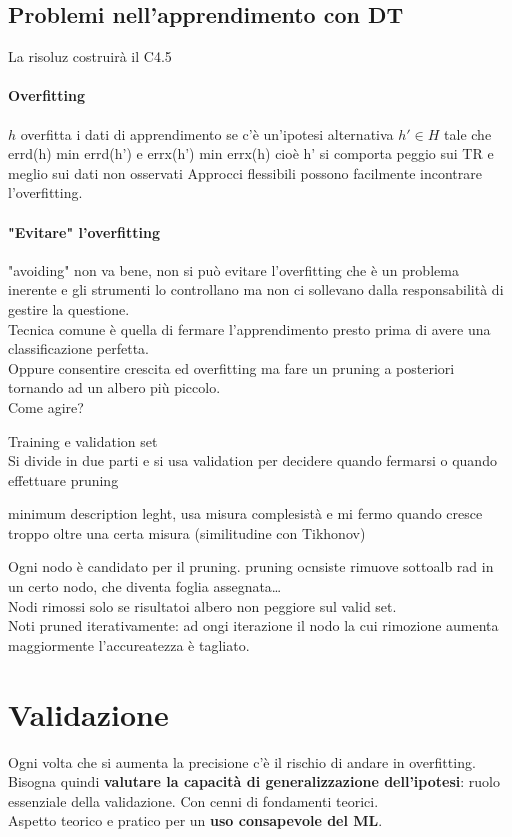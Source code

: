 \documentclass[10pt]{book}
\begin{document}
\subsection{Problemi nell'apprendimento con DT}
La risoluz costruirà il C4.5
\paragraph{Overfitting} %
$h$ overfitta i dati di apprendimento se c'è un'ipotesi alternativa $h' \in H$ tale che errd(h) min errd(h') e errx(h') min errx(h) cioè h' si comporta peggio sui TR e meglio sui dati non osservati
Approcci flessibili possono facilmente incontrare l'overfitting.
\paragraph{"Evitare" l'overfitting} "avoiding" non va bene, non si può evitare l'overfitting che è un problema inerente e gli strumenti lo controllano ma non ci sollevano dalla responsabilità di gestire la questione.\\
Tecnica comune è quella di fermare l'apprendimento presto prima di avere una classificazione perfetta.\\
Oppure consentire crescita ed overfitting ma fare un pruning a posteriori tornando ad un albero più piccolo.\\
Come agire?
\begin{list}{}{}
	\item Training e validation set\\
	Si divide in due parti e si usa validation per decidere quando fermarsi o quando effettuare pruning
	\item minimum description leght, usa misura complesistà e mi fermo quando cresce troppo oltre una certa misura (similitudine con Tikhonov)
\end{list}
Ogni nodo è candidato per il pruning. pruning ocnsiste rimuove sottoalb rad in un certo nodo, che diventa foglia assegnata\ldots\\
Nodi rimossi solo se risultatoi albero non peggiore sul valid set.\\
Noti pruned iterativamente: ad ongi iterazione il nodo la cui rimozione aumenta maggiormente l'accureatezza è tagliato.
\section{Validazione}
Ogni volta che si aumenta la precisione c'è il rischio di andare in overfitting. Bisogna quindi \textbf{valutare la capacità di generalizzazione dell'ipotesi}: ruolo essenziale della validazione. Con cenni di fondamenti teorici.\\
Aspetto teorico e pratico per un \textbf{uso consapevole del ML}.
\end{document}
